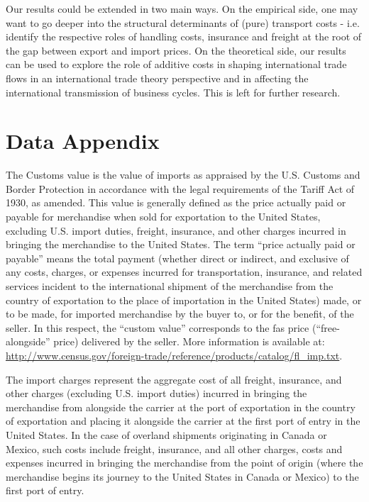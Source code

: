 \documentclass[a4paper,11pt]{article}
\begin{document}
Our results could be extended in two main ways.
On the empirical side, one may want to go deeper into the structural determinants of (pure) transport costs - i.e.
identify the respective roles of handling costs, insurance and freight at the root of the gap between export and import prices.
On the theoretical side, our results can be used to explore the role of additive costs in shaping international trade flows in an international trade theory perspective and in affecting the international transmission of business cycles.
This is left for further research.



\newpage




\newpage


\appendix

\clearpage

\setcounter{table}{0}
\renewcommand{\thefigure}{A.\arabic{figure}}
\renewcommand{\thetable}{A.\arabic{table}}


\section{Data Appendix \label{app:data}}


The Customs value is the value of imports as appraised by the U.S.
Customs and Border Protection in accordance with the legal requirements of the Tariff Act of 1930, as amended.
This value is generally defined as the price actually paid or payable for merchandise when sold for exportation to the United States, excluding U.S.
import duties, freight, insurance, and other charges incurred in bringing the merchandise to the United States.
The term ``price actually paid or payable'' means the total payment (whether direct or indirect, and exclusive of any costs, charges, or expenses incurred for transportation, insurance, and related services incident to the international shipment of the merchandise from the country of exportation to the place of importation in the United States) made, or to be made, for imported merchandise by the buyer to, or for the benefit, of the seller.
In this respect, the ``custom value'' corresponds to the fas price (``free-alongside'' price) delivered by the seller.
More information is available at: \url{http://www.census.gov/foreign-trade/reference/products/catalog/fl_imp.txt}.

The import charges represent the aggregate cost of all freight, insurance, and other charges (excluding U.S.
import duties) incurred in bringing the merchandise from alongside the carrier at the port of exportation in the country of exportation and placing it alongside the carrier at the first port of entry in the United States.
In the case of overland shipments originating in Canada or Mexico, such costs include freight, insurance, and all other charges, costs and expenses incurred in bringing the merchandise from the point of origin (where the merchandise begins its journey to the United States in Canada or Mexico) to the first port of entry.
\end{document}
